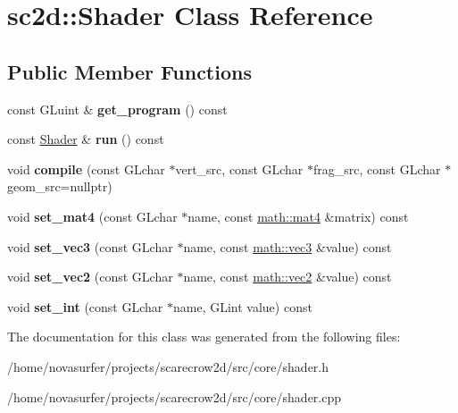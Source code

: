 \hypertarget{classsc2d_1_1Shader}{}\section{sc2d\+:\+:Shader Class Reference}
\label{classsc2d_1_1Shader}
\subsection*{Public Member Functions}
\begin{DoxyCompactItemize}
\item 
\mbox{\label{classsc2d_1_1Shader_aef37c27fd94bb88666c4be6f22de5d64}} 
const G\+Luint \& {\bfseries get\+\_\+program} () const
\item 
\mbox{\label{classsc2d_1_1Shader_ad46388fe322cfc0f8dc075707764cf7e}} 
const \hyperlink{classsc2d_1_1Shader}{Shader} \& {\bfseries run} () const
\item 
\mbox{\label{classsc2d_1_1Shader_a254eeaebe093ccca13c1f59a35e530c4}} 
void {\bfseries compile} (const G\+Lchar $\ast$vert\+\_\+src, const G\+Lchar $\ast$frag\+\_\+src, const G\+Lchar $\ast$geom\+\_\+src=nullptr)
\item 
\mbox{\label{classsc2d_1_1Shader_a63d583ae227b8407f54cbcf8403034ef}} 
void {\bfseries set\+\_\+mat4} (const G\+Lchar $\ast$name, const \hyperlink{structmath_1_1mat4}{math\+::mat4} \&matrix) const
\item 
\mbox{\label{classsc2d_1_1Shader_a6b4705b88448e2a7d2f7a4c271c12999}} 
void {\bfseries set\+\_\+vec3} (const G\+Lchar $\ast$name, const \hyperlink{structmath_1_1vec3}{math\+::vec3} \&value) const
\item 
\mbox{\label{classsc2d_1_1Shader_a53f445adf5cfb80ef103984563c2c91c}} 
void {\bfseries set\+\_\+vec2} (const G\+Lchar $\ast$name, const \hyperlink{structmath_1_1vec2}{math\+::vec2} \&value) const
\item 
\mbox{\label{classsc2d_1_1Shader_a627d78334aeb0b21f0cec7e54a665b0a}} 
void {\bfseries set\+\_\+int} (const G\+Lchar $\ast$name, G\+Lint value) const
\end{DoxyCompactItemize}


The documentation for this class was generated from the following files\+:\begin{DoxyCompactItemize}
\item 
/home/novasurfer/projects/scarecrow2d/src/core/shader.\+h\item 
/home/novasurfer/projects/scarecrow2d/src/core/shader.\+cpp\end{DoxyCompactItemize}
